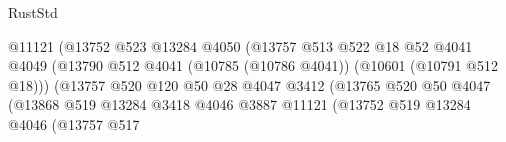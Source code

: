 \begin{lexlean}{RustStd}
\begin{coremodule}
                                                  @11121
                                                  (@13752
                                                    @523
                                                    @13284
                                                    @4050
                                                    (@13757
                                                      @513
                                                      @522
                                                      @18
                                                      @52
                                                      @4041
                                                      @4049
                                                      (@13790
                                                        @512
                                                        @4041
                                                        (@10785 (@10786 @4041))
                                                        (@10601 (@10791 @512 @18)))
                                                      (@13757
                                                        @520
                                                        @120
                                                        @50
                                                        @28
                                                        @4047
                                                        @3412
                                                        (@13765
                                                          @520
                                                          @50
                                                          @4047
                                                          (@13868
                                                            @519
                                                            @13284
                                                            @3418
                                                            @4046
                                                            @3887
                                                            @11121
                                                            (@13752
                                                              @519
                                                              @13284
                                                              @4046
                                                              (@13757
                                                                @517

\end{coremodule}
\end{lexlean}
